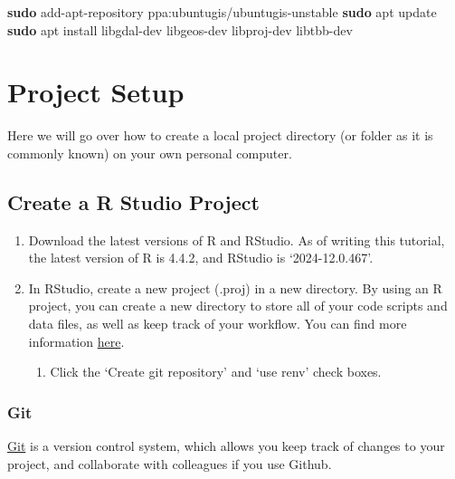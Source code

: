 \documentclass[
]{book}
\newenvironment{Shaded}{\begin{snugshade}}{\end{snugshade}}
\newcommand{\FunctionTok}[1]{\textcolor[rgb]{0.13,0.29,0.53}{\textbf{#1}}}
\newcommand{\NormalTok}[1]{#1}
\providecommand{\tightlist}{%
  \setlength{\itemsep}{0pt}\setlength{\parskip}{0pt}}
\begin{document}
\begin{Shaded}
\begin{Highlighting}[]
\FunctionTok{sudo}\NormalTok{ add{-}apt{-}repository ppa:ubuntugis/ubuntugis{-}unstable}
\FunctionTok{sudo}\NormalTok{ apt update}
\FunctionTok{sudo}\NormalTok{ apt install libgdal{-}dev libgeos{-}dev libproj{-}dev libtbb{-}dev}
\end{Highlighting}
\end{Shaded}

\chapter{Project Setup}\label{project-setup}

Here we will go over how to create a local project directory (or folder as it is commonly known) on your own personal computer.

\section{Create a R Studio Project}\label{create-a-r-studio-project}

\begin{enumerate}
\def\labelenumi{\arabic{enumi}.}
\item
  Download the latest versions of R and RStudio. As of writing this tutorial, the latest version of R is 4.4.2, and RStudio is `2024-12.0.467'.
\item
  In RStudio, create a new project (.proj) in a new directory. By using an R project, you can create a new directory to store all of your code scripts and data files, as well as keep track of your workflow. You can find more information \href{https://support.posit.co/hc/en-us/articles/200526207-Using-RStudio-Projects}{here}.

  \begin{enumerate}
  \def\labelenumii{\alph{enumii}.}
  \tightlist
  \item
    Click the `Create git repository' and `use renv' check boxes.
  \end{enumerate}
\end{enumerate}

\subsection{Git}\label{git}

\href{https://git-scm.com/}{Git} is a version control system, which allows you keep track of changes to your project, and collaborate with colleagues if you use Github.
\end{document}
